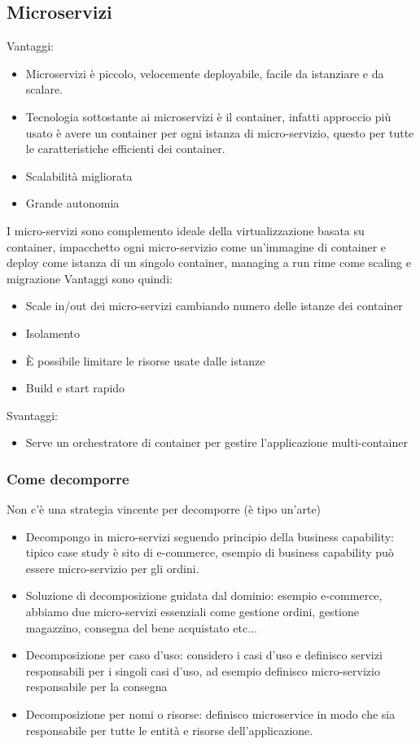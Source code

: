 \documentclass[16px]{article}
\begin{document}
\subsection{Microservizi}
Vantaggi:
\begin{itemize}
\item Microservizi è piccolo, velocemente deployabile, facile da istanziare e da scalare. 
\item Tecnologia sottostante ai microservizi è il container, infatti approccio più usato è avere un container per ogni istanza di micro-servizio, questo per tutte le caratteristiche efficienti dei container.
\item Scalabilità migliorata
\item Grande autonomia
\end{itemize}
I micro-servizi sono complemento ideale della virtualizzazione basata su container, impacchetto ogni micro-servizio come un'immagine di container e deploy come istanza di un singolo container, managing a run rime come scaling e migrazione
Vantaggi sono quindi:
\begin{itemize}
\item Scale in/out dei micro-servizi cambiando numero delle istanze dei container
\item Isolamento
\item È possibile limitare le risorse usate dalle istanze
\item Build e start rapido
\end{itemize}
Svantaggi:
\begin{itemize}
\item Serve un orchestratore di container per gestire l'applicazione multi-container
\end{itemize}
\subsubsection{Come decomporre}
Non c'è una strategia vincente per decomporre (è tipo un'arte)
\begin{itemize}
\item Decompongo in micro-servizi seguendo principio della business capability: tipico case study è sito di e-commerce, esempio di business capability può essere micro-servizio per gli ordini.
\item Soluzione di decomposizione guidata dal dominio: esempio e-commerce, abbiamo due micro-servizi essenziali come gestione ordini, gestione magazzino, consegna del bene acquistato etc...
\item Decomposizione per caso d'uso: considero i casi d'uso e definisco servizi responsabili per i singoli casi d'uso, ad esempio definisco micro-servizio responsabile per la consegna
\item Decomposizione per nomi o risorse: definisco microservice in modo che sia responsabile per tutte le entità e risorse dell'applicazione.
\end{itemize}
\end{document}
